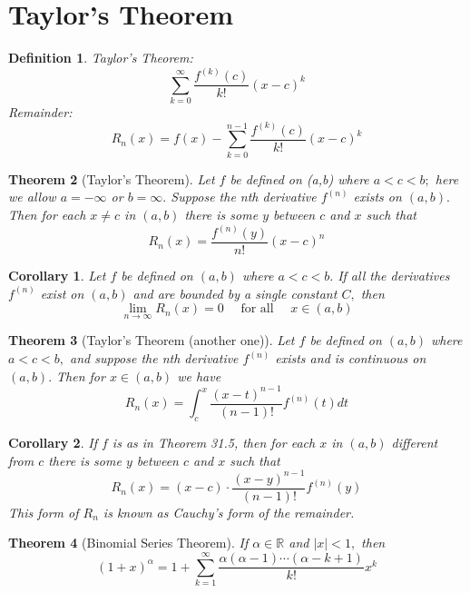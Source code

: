 \documentclass[12pt]{article}
\newtheorem{theorem}{Theorem}[section]
\newtheorem{corollary}{Corollary}[theorem]
\newtheorem{definition}[theorem]{Definition}
\begin{document}
\section{Taylor's Theorem}
\begin{definition}
	Taylor's Theorem: $$
	\sum _ { k = 0 } ^ { \infty } \frac { f ^ { ( k ) } ( c ) } { k ! } ( x - c ) ^ { k }
	$$
	Remainder: $$
	R _ { n } ( x ) = f ( x ) - \sum _ { k = 0 } ^ { n - 1 } \frac { f ^ { ( k ) } ( c ) } { k ! } ( x - c ) ^ { k }
	$$
\end{definition}
\begin{theorem}[Taylor's Theorem]
	Let $f$ be defined on (a,b) where $a < c < b ;$ here we allow $a = - \infty$
	or $b = \infty .$ Suppose the nth derivative $f ^ { ( n ) }$ exists on $( a , b ) .$ Then for
	each $x \neq c$ in $( a , b )$ there is some $y$ between $c$ and $x$ such that $$
	R _ { n } ( x ) = \frac { f ^ { ( n ) } ( y ) } { n ! } ( x - c ) ^ { n }
	$$
\end{theorem}
\begin{corollary}
	Let $f$ be defined on $( a , b )$ where $a < c < b .$ If all the derivatives $f ^ { ( n ) }$
	exist on $( a , b )$ and are bounded by a single constant $C ,$ then
	$$
	\lim _ { n \rightarrow \infty } R _ { n } ( x ) = 0 \quad \text { for all } \quad x \in ( a , b )
	$$
\end{corollary}

\begin{theorem}[Taylor's Theorem (another one)]
	Let $f$ be defined on $( a , b )$ where $a < c < b ,$ and suppose the nth
	derivative $f ^ { ( n ) }$ exists and is continuous on $( a , b ) .$ Then for $x \in ( a , b )$ we have $$
	R _ { n } ( x ) = \int _ { c } ^ { x } \frac { ( x - t ) ^ { n - 1 } } { ( n - 1 ) ! } f ^ { ( n ) } ( t ) d t
	$$
\end{theorem}

\begin{corollary}
	If $f$ is as in Theorem 31.5, then for each $x$ in $( a , b )$ different from $c$
	there is some $y$ between $c$ and $x$ such that $$
	R _ { n } ( x ) = ( x - c ) \cdot \frac { ( x - y ) ^ { n - 1 } } { ( n - 1 ) ! } f ^ { ( n ) } ( y )
	$$ This form of $R _ { n }$ is known as Cauchy's form of the remainder.
\end{corollary}

\begin{theorem}[Binomial Series Theorem]
	If $\alpha \in \mathbb { R }$ and $| x | < 1 ,$ then $$
	( 1 + x ) ^ { \alpha } = 1 + \sum _ { k = 1 } ^ { \infty } \frac { \alpha ( \alpha - 1 ) \cdots ( \alpha - k + 1 ) } { k ! } x ^ { k }
	$$
\end{theorem}
\end{document}
